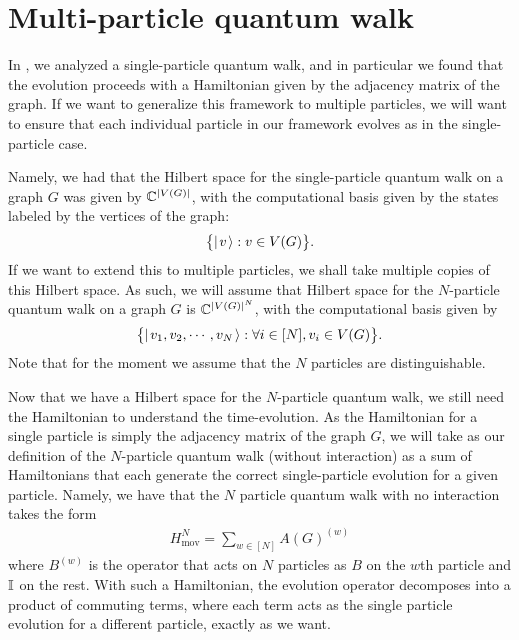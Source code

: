 \documentclass[../thesis-main/thesis-main]{subfiles}
\begin{document}
\section{Multi-particle quantum walk}

In , we analyzed a single-particle quantum walk, and in particular we found that the evolution proceeds with a Hamiltonian given by the adjacency matrix of the graph.  If we want to generalize this framework to multiple particles, we will want to ensure that each individual particle in our framework evolves as in the single-particle case.

Namely, we had that the Hilbert space for the single-particle quantum walk on a graph $G$ was given by $\mathbb{C}^{|V(G)|}$, with the computational basis given by the states labeled by the vertices of the graph:
\begin{align}
  \big\{ |\mspace{2mu} v \mspace{2mu} \rangle: v\in V(G)\big\}.
\end{align}
If we want to extend this to multiple particles, we shall take multiple copies of this Hilbert space.  As such, we will assume that Hilbert space for the $N$-particle quantum walk on a graph $G$ is $\mathbb{C}^{|V(G)|^N}$, with the computational basis given by
\begin{align}
  \big\{ |\mspace{2mu} v_1,v_2,\cdots,v_N \mspace{2mu} \rangle : \forall i \in [N], v_i\in V(G)\big\}.
\end{align}
Note that for the moment we assume that the $N$ particles are distinguishable.

Now that we have a Hilbert space for the $N$-particle quantum walk, we still need the Hamiltonian to understand the time-evolution.  As the Hamiltonian for a single particle is simply the adjacency matrix of the graph $G$, we will take as our definition of the $N$-particle quantum walk (without interaction) as a sum of Hamiltonians that each generate the correct single-particle evolution for a given particle.  Namely, we have that the $N$ particle quantum walk with no interaction takes the form
\begin{align}
  H_{\text{mov}}^N = \sum_{w\in [N]} A(G)^{(w)} \label{eq:MPQW_movement}
\end{align}
where $B^{(w)}$ is the operator that acts on $N$ particles as $B$ on the $w$th particle and $\mathbb{I}$ on the rest.  With such a Hamiltonian, the evolution operator decomposes into a product of commuting terms, where each term acts as the single particle evolution for a different particle, exactly as we want.
\end{document}
